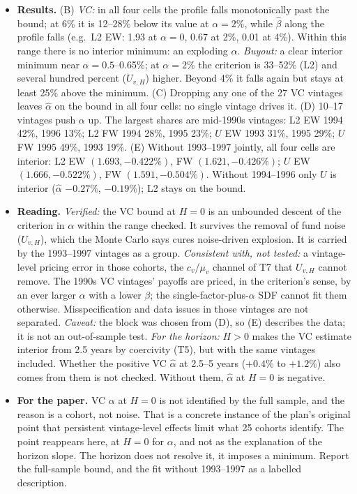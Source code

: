 \documentclass[11pt]{article}
\begin{document}
\begin{itemize}
\item \textbf{Results.} (B) \emph{VC:} in all four cells the profile falls monotonically past the bound; at 6\% it is 12--28\% below its value at $\alpha=2\%$, while $\hat\beta$ along the profile falls (e.g.\ L2 EW: 1.93 at $\alpha=0$, 0.67 at 2\%, 0.01 at 4\%). Within this range there is no interior minimum: an exploding $\alpha$. \emph{Buyout:} a clear interior minimum near $\alpha=0.5$--0.65\%; at $\alpha=2\%$ the criterion is 33--52\% (L2) and several hundred percent ($U_{v,H}$) higher. Beyond 4\% it falls again but stays at least 25\% above the minimum. (C) Dropping any one of the 27 VC vintages leaves $\hat\alpha$ on the bound in all four cells: no single vintage drives it. (D) 10--17 vintages push $\alpha$ up. The largest shares are mid-1990s vintages: L2 EW 1994 42\%, 1996 13\%; L2 FW 1994 28\%, 1995 23\%; $U$ EW 1993 31\%, 1995 29\%; $U$ FW 1995 49\%, 1993 19\%. (E) Without 1993--1997 jointly, all four cells are interior: L2 EW $(1.693, -0.422\%)$, FW $(1.621, -0.426\%)$; $U$ EW $(1.666, -0.522\%)$, FW $(1.591, -0.504\%)$. Without 1994--1996 only $U$ is interior ($\hat\alpha$ $-0.27\%$, $-0.19\%$); L2 stays on the bound.
\item \textbf{Reading.} \emph{Verified:} the VC bound at $H=0$ is an unbounded descent of the criterion in $\alpha$ within the range checked. It survives the removal of fund noise ($U_{v,H}$), which the Monte Carlo says cures noise-driven explosion. It is carried by the 1993--1997 vintages as a group. \emph{Consistent with, not tested:} a vintage-level pricing error in those cohorts, the $c_v$/$\mu_v$ channel of T7 that $U_{v,H}$ cannot remove. The 1990s VC vintages' payoffs are priced, in the criterion's sense, by an ever larger $\alpha$ with a lower $\beta$; the single-factor-plus-$\alpha$ SDF cannot fit them otherwise. Misspecification and data issues in those vintages are not separated. \emph{Caveat:} the block was chosen from (D), so (E) describes the data; it is not an out-of-sample test. \emph{For the horizon:} $H>0$ makes the VC estimate interior from 2.5 years by coercivity (T5), but with the same vintages included. Whether the positive VC $\hat\alpha$ at 2.5--5 years ($+0.4\%$ to $+1.2\%$) also comes from them is not checked. Without them, $\hat\alpha$ at $H=0$ is negative.
\item \textbf{For the paper.} VC $\alpha$ at $H=0$ is not identified by the full sample, and the reason is a cohort, not noise. That is a concrete instance of the plan's original point that persistent vintage-level effects limit what 25 cohorts identify. The point reappears here, at $H=0$ for $\alpha$, and not as the explanation of the horizon slope. The horizon does not resolve it, it imposes a minimum. Report the full-sample bound, and the fit without 1993--1997 as a labelled description.
\end{itemize}
\end{document}
